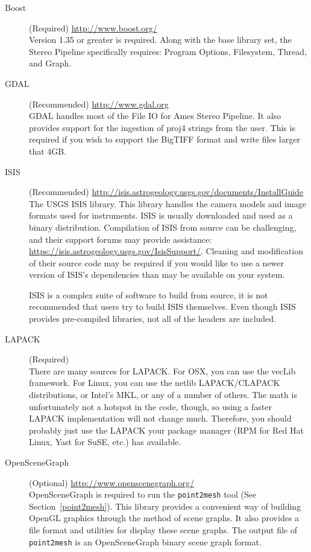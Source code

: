 \begin{description}
\item [{Boost}] (Required) \url{http://www.boost.org/}\\
Version 1.35 or greater is required. Along with the base library
set, the Stereo Pipeline specifically requires: Program Options, Filesystem,
Thread, and Graph.

\item [{GDAL}] (Recommended) \url{http://www.gdal.org}\\
GDAL handles most of the File IO for Ames Stereo Pipeline. It also
provides support for the ingestion of proj4 strings from the
user. This is required if you wish to support the BigTIFF format and
write files larger that 4GB.

\item [{ISIS}] (Recommended) \url{http://isis.astrogeology.usgs.gov/documents/InstallGuide}\\
The \ac{USGS} \acf{ISIS} library. This library handles the camera
models and image formats used for instruments.  \ac{ISIS} is usually
downloaded and used as a binary distribution.  Compilation of
\ac{ISIS} from source can be challenging, and their support forums may
provide assistance:
\url{https://isis.astrogeology.usgs.gov/IsisSupport/}. Cleaning and
modification of their source code may be required if you would like to
use a newer version of ISIS's dependencies than may be available 
on your system.

ISIS is a complex suite of software to build from source, it is not
recommended that users try to build ISIS themselves.  Even though ISIS
provides pre-compiled libraries, not all of the headers are included.

\item [{LAPACK}] (Required)\\
There are many sources for LAPACK\@. For OSX, you can use the
vecLib framework. For Linux, you can use the netlib LAPACK/CLAPACK
distributions, or Intel's MKL, or any of a number of others. The math
is unfortunately not a hotspot in the code, though, so using a faster
LAPACK implementation will not change much. Therefore, you should
probably just use the LAPACK your package manager (RPM for Red Hat
Linux, Yast for SuSE, etc.) has available.

\item [{OpenSceneGraph}] (Optional) \url{http://www.openscenegraph.org/}\\
OpenSceneGraph is required to run the \texttt{point2mesh} tool (See
Section~\ref{point2mesh}). This library provides a convenient way of
building OpenGL graphics through the method of scene graphs. It also
provides a file format and utilities for display these scene
graphs. The output file of \texttt{point2mesh} is an OpenSceneGraph
binary scene graph format.


\end{description}
